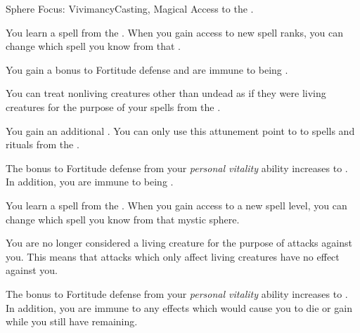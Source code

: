     \begin{feat}{Sphere Focus: Vivimancy}{Casting, Magical}
        \featpre Access to the  .

         You learn a spell from the  .
        When you gain access to new spell ranks, you can change which spell you know from that .

         You gain a  bonus to Fortitude defense and are immune to being \dazed.

         You can treat nonliving creatures other than undead as if they were living creatures for the purpose of your spells from the  .

         You gain an additional .
        You can only use this attunement point to  to spells and rituals from the  .

         The bonus to Fortitude defense from your \textit{personal vitality} ability increases to .
        In addition, you are immune to being \stunned.

         You learn a spell from the  .
        When you gain access to a new spell level, you can change which spell you know from that mystic sphere.

         You are no longer considered a living creature for the purpose of attacks against you.
        This means that attacks which only affect living creatures have no effect against you.

         The bonus to Fortitude defense from your \textit{personal vitality} ability increases to .
        In addition, you are immune to any effects which would cause you to die or gain  while you still have  remaining.
    \end{feat}

